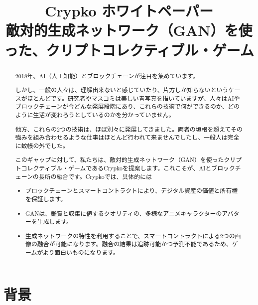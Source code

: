 \documentclass[xelatex,ja=standard]{bxjsarticle}
\title{Crypko ホワイトペーパー\\
  \large 敵対的生成ネットワーク（GAN）を使った、クリプトコレクティブル・ゲーム\\
  \rightline{\small ver 0.8.0}
}
\author{}
\date{}
\begin{document}
\maketitle

\renewcommand\abstractname{概　要}
\begin{abstract}

2018年、AI（人工知能）とブロックチェーンが注目を集めています。

しかし、一般の人々は、理解出来ないと感じていたり、片方しか知らないというケースがほとんどです。研究者やマスコミは美しい青写真を描いていますが、人々はAIやブロックチェーンが今どんな発展段階にあり、これらの技術で何ができるのか、どのように生活が変わろうとしているのかを分かっていません。

他方、これらの2つの技術は、ほぼ別々に発展してきました。両者の垣根を超えてその強みを組み合わせるような仕事はほとんど行われて来ませんでしたし、一般人は完全に蚊帳の外でした。

このギャップに対して、私たちは、敵対的生成ネットワーク（GAN）を使ったクリプトコレクティブル・ゲームであるCrypkoを提案します。これこそが、AIとブロックチェーンの長所の融合です。Crypkoでは、具体的には
\begin{itemize}
\item ブロックチェーンとスマートコントラクトにより、デジタル資産の価値と所有権を保証します。
\item GANは、鑑賞と収集に値するクオリティの、多様なアニメキャラクターのアバターを生成します。
\item 生成ネットワークの特性を利用することで、スマートコントラクトによる2つの画像の融合が可能になります。融合の結果は追跡可能かつ予測不能であるため、ゲームがより面白いものになります。
\end{itemize}

\end{abstract}

\thispagestyle{empty}

\newpage

\section{背景}
\end{document}
